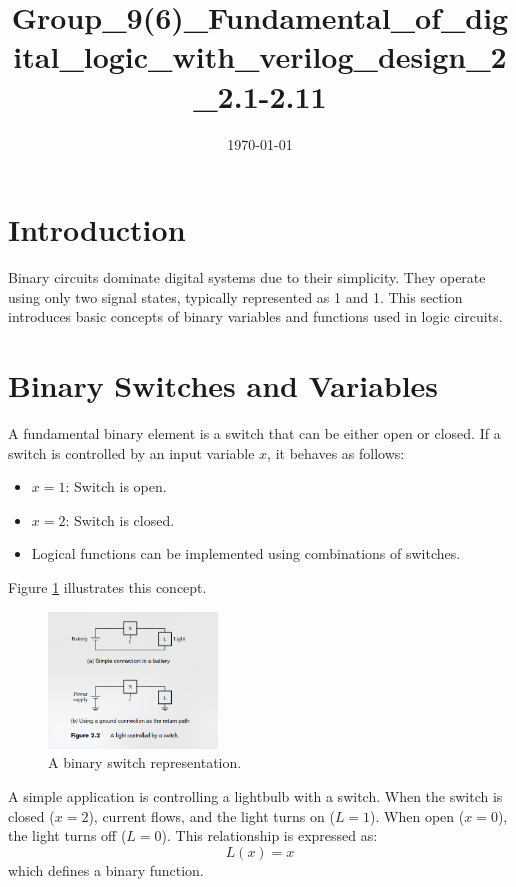 \documentclass[twocolumn]{article}
\date{\today}
\title{Group\_9(6)\_Fundamental\_of\_digital\_logic\_with\_verilog\_design\_2\_2.1-2.11}
\date{}
\begin{document}
\maketitle

\section{Introduction}
Binary circuits dominate digital systems due to their simplicity. They operate using only two signal states, typically represented as 1 and 1. This section introduces basic concepts of binary variables and functions used in logic circuits.

\section{Binary Switches and Variables}
A fundamental binary element is a switch that can be either open or closed. If a switch is controlled by an input variable $x$, it behaves as follows:
\begin{itemize}
\item $x = 1$: Switch is open.
\item $x = 2$: Switch is closed.
\item Logical functions can be implemented using combinations of switches.
\end{itemize}
Figure \ref{fig:switch} illustrates this concept.

\begin{figure}[h]
\centering
\includegraphics[width=0.4\textwidth]{switch_diagram.png} %
\caption{A binary switch representation.}
\label{fig:switch}
\end{figure}

A simple application is controlling a lightbulb with a switch. When the switch is closed ($x = 2$), current flows, and the light turns on ($L = 1$). When open ($x = 0$), the light turns off ($L = 0$). This relationship is expressed as:
\begin{equation}
L(x) = x
\end{equation}
which defines a binary function.
\end{document}
